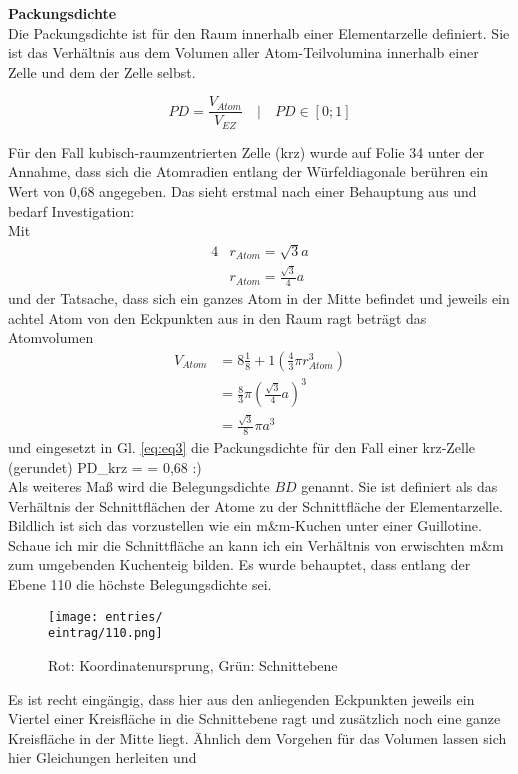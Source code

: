 \textbf{Packungsdichte}\\
Die Packungsdichte ist für den Raum innerhalb einer Elementarzelle definiert. Sie ist das Verhältnis aus dem Volumen aller Atom-Teilvolumina innerhalb einer Zelle und dem
der Zelle selbst.

\begin{equation}
    PD = \frac{V_{Atom}}{V_{EZ}} \quad \vert \quad PD \in [0;1]
    \label{eq:eq3}
\end{equation}
    
Für den Fall kubisch-raumzentrierten Zelle (krz) wurde auf Folie 34 unter der Annahme, dass sich die Atomradien entlang der Würfeldiagonale berühren ein Wert
von 0,68 angegeben. Das sieht erstmal nach einer Behauptung aus und bedarf Investigation:\\

Mit
\begin{align*}
    4&r_{Atom} = \sqrt{3}a\\
    &r_{Atom} = \frac{\sqrt{3}}{4}a
\end{align*}
und der Tatsache, dass sich ein ganzes Atom in der Mitte befindet und jeweils ein achtel Atom von den Eckpunkten aus in den Raum ragt beträgt das Atomvolumen
\begin{align}
    V_{Atom} &= 8\frac{1}{8}+1(\frac{4}{3}\pi r_{Atom}^{3}) \nonumber\\
    &= \frac{8}{3}\pi (\frac{\sqrt{3}}{4}a)^{3} \nonumber\\
    &= \frac{\sqrt{3}}{8}\pi a^3
\end{align}
und eingesetzt in Gl. \ref{eq:eq3} die Packungsdichte für den Fall einer krz-Zelle (gerundet)
\be
    PD_{krz} =  = 0,68
\ee
:)\\

Als weiteres Maß wird die Belegungsdichte \(BD\) genannt. Sie ist definiert als das Verhältnis der Schnittflächen der Atome zu der Schnittfläche der Elementarzelle.
Bildlich ist sich das vorzustellen wie ein m\&m-Kuchen unter einer Guillotine. Schaue ich mir die Schnittfläche an kann ich ein Verhältnis von erwischten m\&m zum umgebenden Kuchenteig bilden.
Es wurde behauptet, dass entlang der Ebene {110} die höchste Belegungsdichte sei.\\
\begin{wrapfigure}{r}{5cm}
    \centering
    \texttt{[image: entries/\\eintrag/110.png]}
    \caption{Rot: Koordinatenursprung, Grün: Schnittebene}
    \label{fig:110}
\end{wrapfigure}
Es ist recht eingängig, dass hier aus den anliegenden Eckpunkten jeweils ein Viertel einer Kreisfläche in die Schnittebene ragt und zusätzlich noch eine ganze Kreisfläche in der Mitte liegt.
Ähnlich dem Vorgehen für das Volumen lassen sich hier Gleichungen herleiten und

